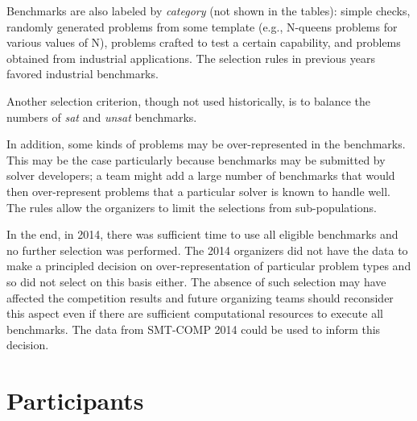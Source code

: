 \documentclass[twoside,11pt]{article}
\begin{document}
Benchmarks are also labeled by \emph{category} (not shown in the tables): simple checks, randomly generated problems from some template (e.g., N-queens problems for various values of N), problems crafted to test a certain capability, and problems obtained from industrial applications. The selection rules in previous years favored industrial benchmarks.

Another selection criterion, though not used historically, is to balance the numbers of \textit{sat} and \textit{unsat} benchmarks.

In addition, some kinds of problems may be over-represented in the benchmarks. This may be the case particularly because benchmarks may be submitted by solver developers; a team might add a large number of benchmarks that would then over-represent problems that a particular solver is known to handle well. The rules allow the organizers to limit the selections from sub-populations.

In the end, in 2014, there was sufficient time to use all eligible benchmarks and no further selection was performed. The 2014 organizers did not have the data to make a principled decision on over-representation of particular problem types and so did not select on this basis either. The absence of such selection may have affected the competition results and future organizing teams should reconsider this aspect even if there are sufficient computational resources to execute all benchmarks. The data from SMT-COMP 2014 could be used to inform this decision.



\section{Participants}
\label{sec:participants}
\end{document}
